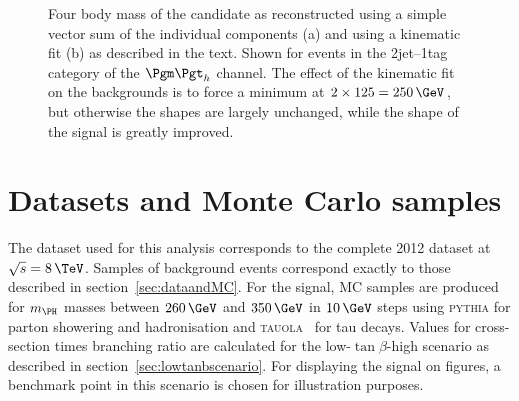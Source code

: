 \begin{figure}
\begin{center}

\end{center}
\caption[Four body mass of the candidate \PH in data and MC events reconstructed
with and without a kinematic fit.]{
Four body mass of the candidate \PH as reconstructed using a simple vector sum of the
individual components (a) and using a kinematic fit (b) as
described in the text. Shown for events in the 2jet--1tag category of the
$\mutau$ channel. The effect of the kinematic fit on the backgrounds is to force
a minimum at $2\times125=250\,\GeV$, but otherwise the shapes are largely
unchanged, while the shape of the signal is greatly improved.}
\label{fig:kinfitvsmttbbstacked}
\end{figure} 

\section{Datasets and Monte Carlo samples}
\label{sec:Hhhdatasets}

The dataset used for this analysis corresponds to the complete 2012 dataset at
$\sqrt{s}=8\,\TeV$. Samples of background events correspond exactly to those
described in section~\ref{sec:dataandMC}. For the signal, \ac{MC} samples are
produced for $m_{\PH}$ masses between $260\,\GeV$ and $350\,\GeV$ in $10\,\GeV$
steps using \textsc{pythia}
for parton showering and hadronisation and \textsc{tauola}~\cite{TAUOLA} for tau
decays. Values for cross-section times branching ratio are calculated for the
low-$\tan\beta$-high scenario as described in section~\ref{sec:lowtanbscenario}.
For displaying the signal on figures, a benchmark point in this scenario is
chosen for illustration purposes.

